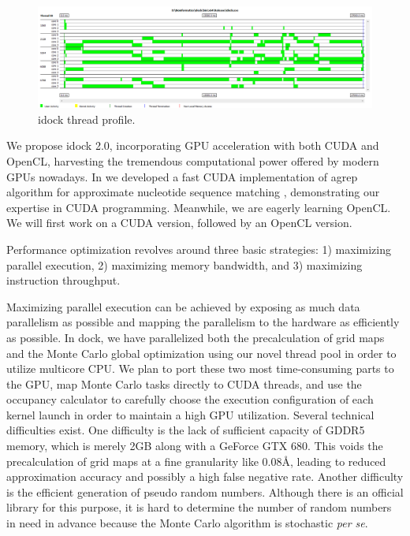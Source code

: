 \begin{figure}
\centering
\includegraphics[width=\textwidth]{idock/ThreadProfile.png}
\caption{idock thread profile.}
\label{idock:ThreadProfile}
\end{figure}

We propose idock 2.0, incorporating GPU acceleration with both CUDA and OpenCL, harvesting the tremendous computational power offered by modern GPUs nowadays. In \citeyear{1138} we developed a fast CUDA implementation of agrep algorithm for approximate nucleotide sequence matching \citep{1138}, demonstrating our expertise in CUDA programming. Meanwhile, we are eagerly learning OpenCL. We will first work on a CUDA version, followed by an OpenCL version.

Performance optimization revolves around three basic strategies: 1) maximizing parallel execution, 2) maximizing memory bandwidth, and 3) maximizing instruction throughput.

Maximizing parallel execution can be achieved by exposing as much data parallelism as possible and mapping the parallelism to the hardware as efficiently as possible. In dock, we have parallelized both the precalculation of grid maps and the Monte Carlo global optimization using our novel thread pool in order to utilize multicore CPU. We plan to port these two most time-consuming parts to the GPU, map Monte Carlo tasks directly to CUDA threads, and use the occupancy calculator to carefully choose the execution configuration of each kernel launch in order to maintain a high GPU utilization. Several technical difficulties exist. One difficulty is the lack of sufficient capacity of GDDR5 memory, which is merely 2GB along with a GeForce GTX 680. This voids the precalculation of grid maps at a fine granularity like 0.08\AA, leading to reduced approximation accuracy and possibly a high false negative rate. Another difficulty is the efficient generation of pseudo random numbers. Although there is an official library for this purpose, it is hard to determine the number of random numbers in need in advance because the Monte Carlo algorithm is stochastic \textit{per se}.

